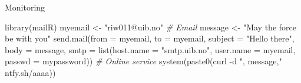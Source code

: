 \documentclass[
  ignorenonframetext,
  usenames,
  dvipsnames]{beamer}
\newenvironment{Shaded}{\begin{snugshade}}{\end{snugshade}}
\newcommand{\AttributeTok}[1]{\textcolor[rgb]{0.77,0.63,0.00}{#1}}
\newcommand{\CommentTok}[1]{\textcolor[rgb]{0.56,0.35,0.01}{\textit{#1}}}
\newcommand{\FunctionTok}[1]{\textcolor[rgb]{0.00,0.00,0.00}{#1}}
\newcommand{\NormalTok}[1]{#1}
\newcommand{\OtherTok}[1]{\textcolor[rgb]{0.56,0.35,0.01}{#1}}
\newcommand{\StringTok}[1]{\textcolor[rgb]{0.31,0.60,0.02}{#1}}
\begin{document}
\begin{frame}[fragile]{Monitoring}
\protect\hypertarget{monitoring}{}
\small

\begin{Shaded}
\begin{Highlighting}[]
\FunctionTok{library}\NormalTok{(mailR)}
\NormalTok{myemail }\OtherTok{\textless{}{-}} \StringTok{"riw011@uib.no"}
\CommentTok{\# Email}
\NormalTok{message }\OtherTok{\textless{}{-}} \StringTok{"May the force be with you"}
\FunctionTok{send.mail}\NormalTok{(}\AttributeTok{from =}\NormalTok{ myemail,}
          \AttributeTok{to =}\NormalTok{ myemail,}
          \AttributeTok{subject =} \StringTok{"Hello there"}\NormalTok{,}
          \AttributeTok{body =}\NormalTok{ message,}
          \AttributeTok{smtp =} \FunctionTok{list}\NormalTok{(}\AttributeTok{host.name =} \StringTok{"smtp.uib.no"}\NormalTok{,}
                      \AttributeTok{user.name =}\NormalTok{ myemail,}
                      \AttributeTok{passwd =}\NormalTok{ mypassword))}
\CommentTok{\# Online service}
\FunctionTok{system}\NormalTok{(}\FunctionTok{paste0}\NormalTok{(}\StringTok{\textquotesingle{}curl {-}d "\textquotesingle{}}\NormalTok{, message,}\StringTok{\textquotesingle{}" ntfy.sh/aaaa\textquotesingle{}}\NormalTok{))}
\end{Highlighting}
\end{Shaded}

\normalsize
\end{frame}
\end{document}
